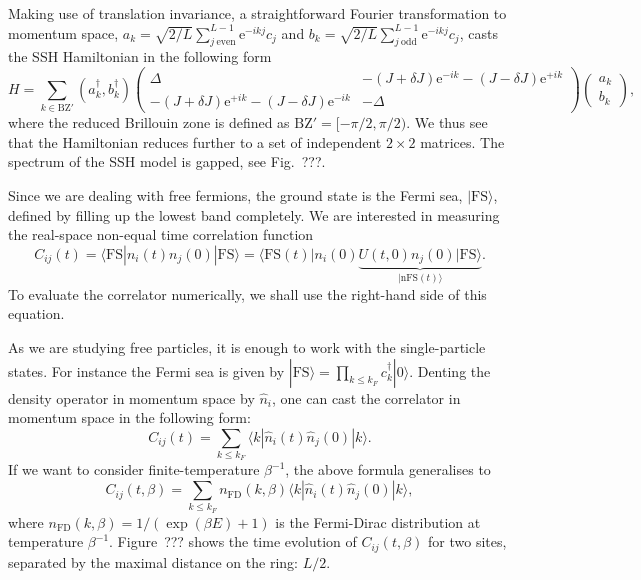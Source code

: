 \documentclass{SciPost}
\newcommand\0{\scalebox{-1}[1]{0}}
\begin{document}
Making use of translation invariance, a straightforward Fourier transformation to momentum space, $a_k = \sqrt{2/L}\sum_{j\ \mathrm{even}}^{L-1} \mathrm e^{-i k j}c_{j}$ and $b_k = \sqrt{2/L}\sum_{j\ \mathrm{odd}}^{L-1}\mathrm e^{-i k j} c_{j}$, casts the SSH Hamiltonian in the following form
\begin{equation}
H \!=\! \sum_{k\in\mathrm{BZ'}} (a^\dagger_k,b^\dagger_k)
\left(\begin{array}{cc}
\Delta & -(J+\delta J)\mathrm e^{-i k} - (J-\delta J)\mathrm e^{+i k} \\
-(J+\delta J)\mathrm e^{+i k} - (J-\delta J)\mathrm e^{-i k} & -\Delta
\end{array}
\right)
\left(\! \begin{array}{c}
a_k\\
b_k
\end{array}
\!\right),
\end{equation}
where the reduced Brillouin zone is defined as $\mathrm{BZ'}=[-\pi/2,\pi/2)$. We thus see that the Hamiltonian reduces further to a set of independent $2\times 2$ matrices. The spectrum of the SSH model is gapped, see Fig.~???.

Since we are dealing with free fermions, the ground state is the Fermi sea, $|\mathrm{FS}\rangle$, defined by filling up the lowest band completely. We are interested in measuring the real-space non-equal time correlation function
\begin{equation}
\label{eq:SSH_corr}
C_{ij}(t) = \langle \mathrm{FS}|n_i(t)n_j(0)|\mathrm{FS}\rangle = \langle \mathrm{FS}(t)|n_i(0)\underbrace{U(t,0)n_j(0)|\mathrm{FS}\rangle}_{|\mathrm{nFS}(t)\rangle}.
\end{equation}
To evaluate the correlator numerically, we shall use the right-hand side of this equation.

As we are studying free particles, it is enough to work with the single-particle states. For instance the Fermi sea is given by $|\mathrm{FS}\rangle = \prod_{k\leq k_F}c^\dagger_k|0\rangle$. Denting the density operator in momentum space by $\hat n_{i}$, one can cast the correlator in momentum space in the following form:
\begin{equation}
C_{ij}(t) = \sum_{k\leq k_F}\langle k|\hat n_i(t)\hat n_j(0)|k\rangle.
\end{equation}
If we want to consider finite-temperature $\beta^{-1}$, the above formula generalises to
\begin{equation}
C_{ij}(t,\beta) = \sum_{k\leq k_F}n_\mathrm{FD}(k,\beta)\langle k|\hat n_i(t)\hat n_j(0)|k\rangle,
\end{equation} 
where $n_\mathrm{FD}(k,\beta) = 1/(\exp(\beta E)+1)$ is the Fermi-Dirac distribution at temperature $\beta^{-1}$. Figure~??? shows the time evolution of $C_{ij}(t,\beta)$ for two sites, separated by the maximal distance on the ring: $L/2$. 
\end{document}
